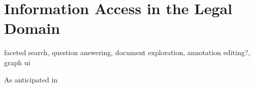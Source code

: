 \chapter{Information Access in the Legal Domain}
\label{chap:legalia}

faceted search, question answering, document exploration, annotation editing?, graph ui

As anticipated in 